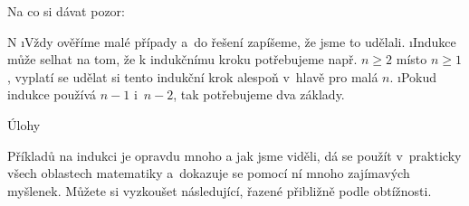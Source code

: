 Na co si dávat pozor:

\begitems \style N
\i Vždy ověříme malé případy a~do řešení zapíšeme, že jsme to udělali.
\i Indukce může selhat na tom, že k indukčnímu kroku potřebujeme např. $n \ge 2$ místo $n \ge 1$, vyplatí se udělat si tento indukční krok alespoň v~hlavě pro malá $n$.
\i Pokud indukce používá $n-1$ i~$n-2$, tak potřebujeme dva základy.
\enditems

\sec Úlohy

Příkladů na indukci je opravdu mnoho a jak jsme viděli, dá se použít v~prakticky všech oblastech matematiky a~dokazuje se pomocí ní mnoho zajímavých myšlenek. Můžete si vyzkoušet následující, řazené přibližně podle obtížnosti.



